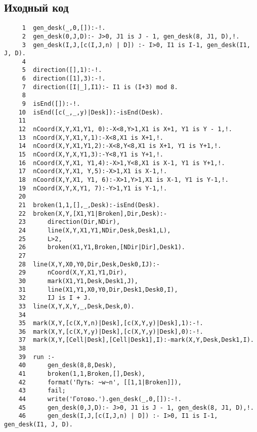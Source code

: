 \subsection{Иходный код}
\begin{verbatim}
     1	gen_desk(_,0,[]):-!.
     2	gen_desk(0,J,D):- J>0, J1 is J - 1, gen_desk(8, J1, D),!.
     3	gen_desk(I,J,[c(I,J,n) | D]) :- I>0, I1 is I-1, gen_desk(I1, J, D). 
     4	
     5	direction([],1):-!.
     6	direction([1],3):-!.
     7	direction([I|_],I1):- I1 is (I+3) mod 8.
     8	
     9	isEnd([]):-!.
    10	isEnd([c(_,_,y)|Desk]):-isEnd(Desk).
    11	
    12	nCoord(X,Y,X1,Y1, 0):-X<8,Y>1,X1 is X+1, Y1 is Y - 1,!.
    13	nCoord(X,Y,X1,Y,1):-X<8,X1 is X+1,!.
    14	nCoord(X,Y,X1,Y1,2):-X<8,Y<8,X1 is X+1, Y1 is Y+1,!.
    15	nCoord(X,Y,X,Y1,3):-Y<8,Y1 is Y+1,!.
    16	nCoord(X,Y,X1, Y1,4):-X>1,Y<8,X1 is X-1, Y1 is Y+1,!.
    17	nCoord(X,Y,X1, Y,5):-X>1,X1 is X-1,!.
    18	nCoord(X,Y,X1, Y1, 6):-X>1,Y>1,X1 is X-1, Y1 is Y-1,!.
    19	nCoord(X,Y,X,Y1, 7):-Y>1,Y1 is Y-1,!.
    20	
    21	broken(1,1,[],_,Desk):-isEnd(Desk).
    22	broken(X,Y,[X1,Y1|Broken],Dir,Desk):-
    23	    direction(Dir,NDir),
    24	    line(X,Y,X1,Y1,NDir,Desk,Desk1,L),
    25		L>2,
    26		broken(X1,Y1,Broken,[NDir|Dir],Desk1).
    27	
    28	line(X,Y,X0,Y0,Dir,Desk,Desk0,IJ):-
    29		nCoord(X,Y,X1,Y1,Dir),
    30	    mark(X1,Y1,Desk,Desk1,J),
    31	    line(X1,Y1,X0,Y0,Dir,Desk1,Desk0,I),
    32		IJ is I + J.
    33	line(X,Y,X,Y,_,Desk,Desk,0).
    34	
    35	mark(X,Y,[c(X,Y,n)|Desk],[c(X,Y,y)|Desk],1):-!.
    36	mark(X,Y,[c(X,Y,y)|Desk],[c(X,Y,y)|Desk],0):-!.
    37	mark(X,Y,[Cell|Desk],[Cell|Desk1],I):-mark(X,Y,Desk,Desk1,I).
    38	
    39	run :-
    40		gen_desk(8,8,Desk),
    41		broken(1,1,Broken,[],Desk),
    42		format('Путь: ~w~n', [[1,1|Broken]]),
    43		fail;
    44		write('Готово.').gen_desk(_,0,[]):-!.
    45		gen_desk(0,J,D):- J>0, J1 is J - 1, gen_desk(8, J1, D),!.
    46		gen_desk(I,J,[c(I,J,n) | D]) :- I>0, I1 is I-1, gen_desk(I1, J, D). 
\end{verbatim}

